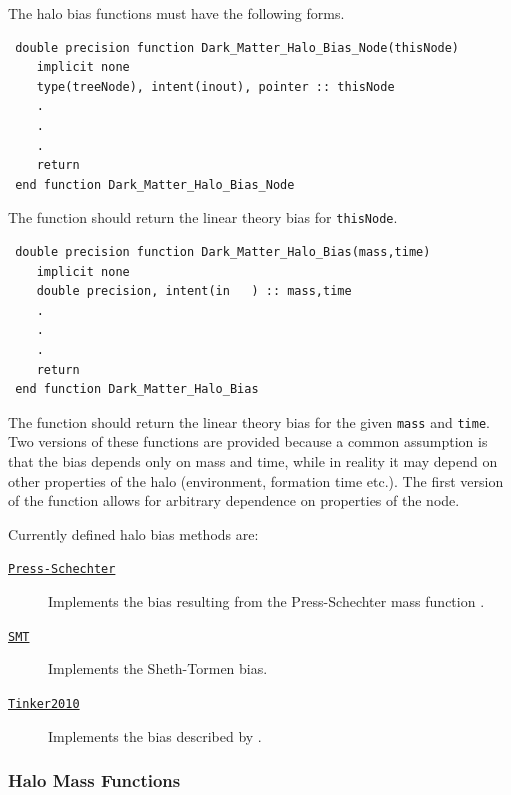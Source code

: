 The halo bias functions must have the following forms.
\begin{verbatim}
 double precision function Dark_Matter_Halo_Bias_Node(thisNode)
    implicit none
    type(treeNode), intent(inout), pointer :: thisNode
    .
    .
    .
    return
 end function Dark_Matter_Halo_Bias_Node
\end{verbatim}
The function should return the linear theory bias for {\tt thisNode}.
\begin{verbatim}
 double precision function Dark_Matter_Halo_Bias(mass,time)
    implicit none
    double precision, intent(in   ) :: mass,time
    .
    .
    .
    return
 end function Dark_Matter_Halo_Bias
\end{verbatim}
The function should return the linear theory bias for the given {\tt mass} and {\tt time}. Two versions of these functions are provided because a common assumption is that the bias depends only on mass and time, while in reality it may depend on other properties of the halo (environment, formation time etc.). The first version of the function allows for arbitrary dependence on properties of the node.

Currently defined halo bias methods are:
\begin{description}
 \item [\hyperlink{structure_formation.CDM.halo_bias.Press-Schechter.F90:dark_matter_halo_biases_press_schechter:dark_matter_halo_bias_press_schechter}{{\tt Press-Schechter}}] Implements the bias resulting from the Press-Schechter \citep{press_formation_1974} mass function \citep{mo_analytic_1996}.
 \item [\hyperlink{structure_formation.CDM.halo_bias.SMT.F90:dark_matter_halo_biases_smt:dark_matter_halo_bias_smt}{{\tt SMT}}] Implements the Sheth-Tormen \citep{sheth_ellipsoidal_2001} bias.
 \item [\hyperlink{structure_formation.CDM.halo_bias.Tinker2010.F90:dark_matter_halo_biases_tinker2010:dark_matter_halo_bias_tinker2010}{{\tt Tinker2010}}] Implements the bias described by \cite{tinker_large_2010}.
\end{description}

\subsubsection{Halo Mass Functions}

